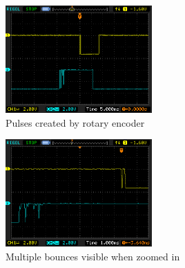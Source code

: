 \documentclass{article}
\begin{document}
\begin{figure}
\centering
\includegraphics[width=0.5\textwidth]{quadrature_decoder_rigol.png}
\caption{Pulses created by rotary encoder}
\end{figure}
\begin{figure}
\centering
\includegraphics[width=0.5\textwidth]{quadrature_decoder_bounces.png}
\caption{Multiple bounces visible when zoomed in}
\end{figure}
\end{document}

